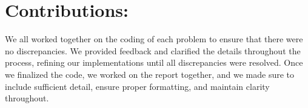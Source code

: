 \documentclass{report}
\begin{document}
\section*{Contributions:}
We all worked together on the coding of each problem to ensure that there were no discrepancies. We provided feedback and clarified the details throughout the process, refining our implementations until all discrepancies were resolved. Once we finalized the code, we worked on the report together, and we made sure to include sufficient detail, ensure proper formatting, and maintain clarity throughout.


\pagebreak
\end{document}
